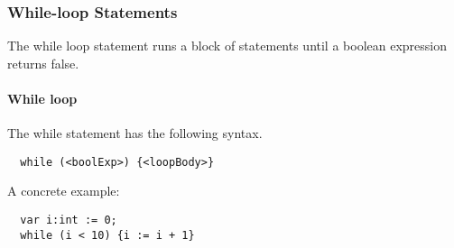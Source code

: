 \subsubsection{While-loop Statements}
\label{subsec:whileLoopStatements}

The while loop statement runs a block of statements until a boolean expression returns false.

\paragraph{While loop}
\label{sec:whileLoop}

The while statement has the following syntax.

\begin{verbatim}
  while (<boolExp>) {<loopBody>}
\end{verbatim}

A concrete example:

\begin{verbatim}
  var i:int := 0;
  while (i < 10) {i := i + 1}
\end{verbatim}
